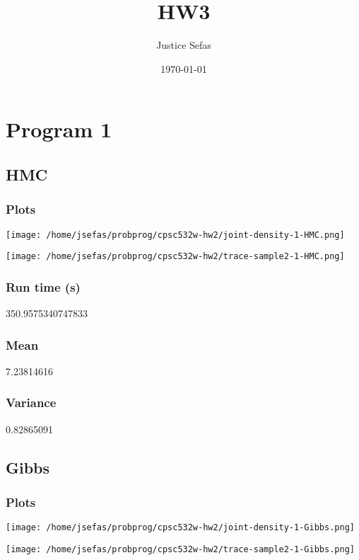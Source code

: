 \documentclass[11pt]{article}
\author{Justice Sefas}
\date{\today}
\title{HW3}
\begin{document}
\maketitle


\section*{Program 1}
\label{sec:org4245d85}
\subsection*{HMC}
\label{sec:org2638ba9}
\subsubsection*{Plots}
\label{sec:org2dff762}
\begin{center}
\texttt{[image: /home/jsefas/probprog/cpsc532w-hw2/joint-density-1-HMC.png]}
\end{center}
\begin{center}
\texttt{[image: /home/jsefas/probprog/cpsc532w-hw2/trace-sample2-1-HMC.png]}
\end{center}
\subsubsection*{Run time (s)}
\label{sec:org8a77829}
350.9575340747833
\subsubsection*{Mean}
\label{sec:org84d55d2}
7.23814616
\subsubsection*{Variance}
\label{sec:org6a574b3}
0.82865091

\subsection*{Gibbs}
\label{sec:org2375f22}
\subsubsection*{Plots}
\label{sec:org32cc8c8}
\begin{center}
\texttt{[image: /home/jsefas/probprog/cpsc532w-hw2/joint-density-1-Gibbs.png]}
\end{center}
\begin{center}
\texttt{[image: /home/jsefas/probprog/cpsc532w-hw2/trace-sample2-1-Gibbs.png]}
\end{center}
\end{document}
